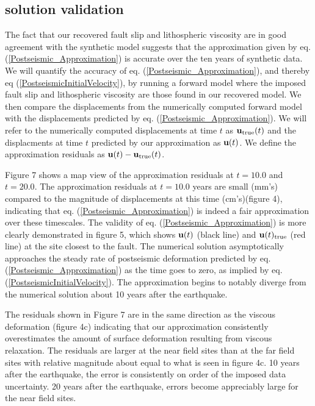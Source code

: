 \documentclass[12pt]{article}
\begin{document}
\subsection{solution validation}
The fact that our recovered fault slip and lithospheric viscosity are
in good agreement with the synthetic model suggests that the
approximation given by eq. (\ref{Postseismic_Approximation}) is
accurate over the ten years of synthetic data.  We will quantify the
accuracy of eq. (\ref{Postseismic_Approximation}), and thereby eq
(\ref{PostseismicInitialVelocity}), by running a forward model where
the imposed fault slip and lithospheric viscosity are those found in
our recovered model.  We then compare the displacements from the
numerically computed forward model with the displacements predicted by
eq. (\ref{Postseismic_Approximation}).  We will refer to the
numerically computed displacements at time $t$ as
$\bold{u}_{\mathrm{true}}(t)$ and the displacments at time $t$
predicted by our approximation as $\bold{u}(t)$.  We define the
approximation residuals as $\bold{u}(t) - \bold{u}_{\mathrm{true}}(t)$.

Figure 7 shows a map view of the approximation residuals at $t=10.0$
and $t=20.0$.  The approximation residuals at $t=10.0$ years are small
(mm's) compared to the magnitude of displacements at this time
(cm's)(figure 4), indicating that
eq. (\ref{Postseismic_Approximation}) is indeed a fair approximation
over these timescales.  The validity of
eq. (\ref{Postseismic_Approximation}) is more clearly demonstrated in
figure 5, which shows $\bold{u}(t)$ (black line) and
$\bold{u}(t)_{\mathrm{true}}$ (red line) at the site closest to the
fault.  The numerical solution asymptotically approaches the steady
rate of postseismic deformation predicted by
eq. (\ref{Postseismic_Approximation}) as the time goes to zero, as
implied by eq. (\ref{PostseismicInitialVelocity}).  The approximation
begins to notably diverge from the numerical solution about 10 years
after the earthquake.

The residuals shown in Figure 7 are in the same direction
as the viscous deformation (figure 4c) indicating that our
approximation consistently overestimates the amount of surface
deformation resulting from viscous relaxation.  The residuals are
larger at the near field sites than at the far field sites with
relative magnitude about equal to what is seen in figure 4c.  10 years
after the earthquake, the error is consistently on order of the
imposed data uncertainty.  20 years after the earthquake, errors
become appreciably large for the near field sites.
\end{document}
